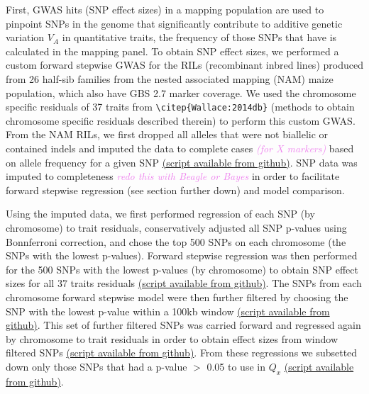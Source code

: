 \documentclass[9pt,twocolumn,twoside]{gsajnl}
\newcommand{\kc}[1]{\textcolor{violet}{ \emph{ #1}} }
\begin{document}
First, GWAS hits (SNP effect sizes) in a mapping population are used to pinpoint SNPs in the genome that significantly contribute to additive genetic variation $V_A$ in quantitative traits, the frequency of those SNPs that have is calculated in the mapping panel. 
To obtain SNP effect sizes, we performed a custom forward stepwise GWAS for the RILs (recombinant inbred lines) produced from 26 half-sib families from the nested associated mapping (NAM) maize population, which also have GBS 2.7 marker coverage.
We used the chromosome specific residuals of 37 traits from \verb|\citep{Wallace:2014db}| (methods to obtain chromosome specific residuals described therein) to perform this custom GWAS. 
From the NAM RILs, we first dropped all alleles that were not biallelic or contained indels and imputed the data to complete cases \kc{(for X markers)} based on allele frequency for a given SNP \href{https://github.com/RILAB/historical_genomics/blob/master/scripts/bulk_imputation_script1.R}{(script available from github)}. 
SNP data was imputed to completeness \kc{redo this with Beagle or Bayes} in order to facilitate forward stepwise regression (see section further down) and model comparison.  


Using the imputed data, we first performed regression of each SNP (by chromosome) to trait residuals, conservatively adjusted all SNP p-values using Bonnferroni correction, and chose the top 500 SNPs on each chromosome (the SNPs with the lowest p-values). 
Forward stepwise regression was then performed for the 500 SNPs with the lowest p-values (by chromosome) to obtain SNP effect sizes for all 37 traits residuals \href{https://github.com/RILAB/historical_genomics/blob/master/scripts/single_step_NAM_script_2.R}{(script available from github)}. 
The SNPs from each chromosome forward stepwise model were then further filtered by choosing the SNP with the lowest p-value within a 100kb window \href{https://github.com/RILAB/historical_genomics/blob/master/scripts/filter_snp_effects_script_3.R}{(script available from github)}. 
This set of further filtered SNPs was carried forward and regressed again by chromosome to trait residuals in order to obtain effect sizes from window filtered SNPs \href{https://github.com/RILAB/historical_genomics/blob/master/scripts/final_effects_script_4.R}{(script available from github)}. 
From these regressions we subsetted down only those SNPs that had a p-value $>$ 0.05 to use in $Q_x$ \href{https://github.com/RILAB/historical_genomics/blob/master/scripts/script5.R}{(script available from github)}.
\end{document}
